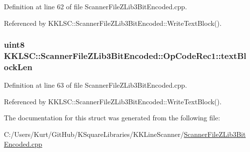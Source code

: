 Definition at line 62 of file Scanner\+File\+Z\+Lib3\+Bit\+Encoded.\+cpp.



Referenced by K\+K\+L\+S\+C\+::\+Scanner\+File\+Z\+Lib3\+Bit\+Encoded\+::\+Write\+Text\+Block().

\subsubsection[{\texorpdfstring{text\+Block\+Len}{textBlockLen}}]{\setlength{\rightskip}{0pt plus 5cm}uint8 K\+K\+L\+S\+C\+::\+Scanner\+File\+Z\+Lib3\+Bit\+Encoded\+::\+Op\+Code\+Rec1\+::text\+Block\+Len}\hypertarget{struct_scanner_file_z_lib3_bit_encoded_1_1_op_code_rec1_a5aaf6daf0ee2641077d11ea31e395785}{}\label{struct_scanner_file_z_lib3_bit_encoded_1_1_op_code_rec1_a5aaf6daf0ee2641077d11ea31e395785}


Definition at line 63 of file Scanner\+File\+Z\+Lib3\+Bit\+Encoded.\+cpp.



Referenced by K\+K\+L\+S\+C\+::\+Scanner\+File\+Z\+Lib3\+Bit\+Encoded\+::\+Write\+Text\+Block().



The documentation for this struct was generated from the following file\+:\begin{DoxyCompactItemize}
\item 
C\+:/\+Users/\+Kurt/\+Git\+Hub/\+K\+Square\+Libraries/\+K\+K\+Line\+Scanner/\hyperlink{_scanner_file_z_lib3_bit_encoded_8cpp}{Scanner\+File\+Z\+Lib3\+Bit\+Encoded.\+cpp}\end{DoxyCompactItemize}
